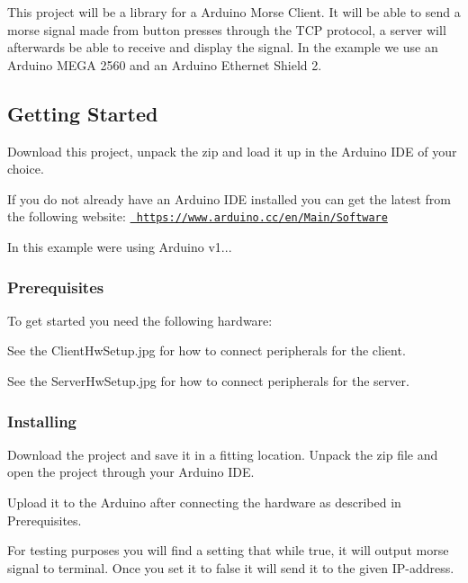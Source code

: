 This project will be a library for a Arduino Morse Client. It will be able to send a morse signal made from button presses through the T\+CP protocol, a server will afterwards be able to receive and display the signal. In the example we use an Arduino M\+E\+GA 2560 and an Arduino Ethernet Shield 2.

\subsection*{Getting Started}

Download this project, unpack the zip and load it up in the Arduino I\+DE of your choice.

If you do not already have an Arduino I\+DE installed you can get the latest from the following website\+: \href{https://www.arduino.cc/en/Main/Software}{\texttt{ https\+://www.\+arduino.\+cc/en/\+Main/\+Software}}

In this example we\textquotesingle{}re using Arduino v1...

\subsubsection*{Prerequisites}

To get started you need the following hardware\+:


\begin{DoxyCode}{0}
\end{DoxyCode}


See the Client\+Hw\+Setup.\+jpg for how to connect peripherals for the client.

See the Server\+Hw\+Setup.\+jpg for how to connect peripherals for the server.

\subsubsection*{Installing}

Download the project and save it in a fitting location. Unpack the zip file and open the project through your Arduino I\+DE.

Upload it to the Arduino after connecting the hardware as described in Prerequisites.

For testing purposes you will find a setting that while true, it will output morse signal to terminal. Once you set it to false it will send it to the given I\+P-\/address. 
\begin{DoxyCode}{0}
\end{DoxyCode}
 
